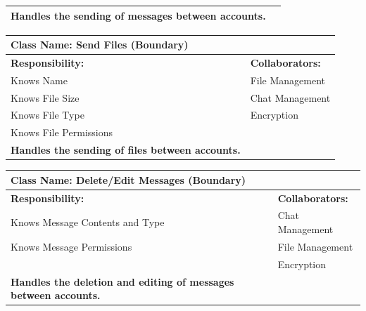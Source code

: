 \documentclass[]{article}
\begin{document}
\begin{itemize}
\begin{table}[ht]
\begin{tabular}{|p{7cm}|p{7cm}|}
            \vspace{0.1in}
            \textbf{Handles the sending of messages between accounts.}

		\vspace{1in} & \\
		\hline
  
		\end{tabular}
	\end{table}

 
	\begin{table}[ht]
		\centering
		\begin{tabular}{|p{7cm}|p{7cm}|}
		\hline 
		 \multicolumn{2}{|l|}{\textbf{Class Name: Send Files (Boundary)
}} \\
		\hline
		\textbf{Responsibility:} & \textbf{Collaborators:} \\
		\hline
            Knows Name & File Management\\
            Knows File Size & Chat Management\\
            Knows File Type & Encryption\\
            Knows File Permissions\\
            
            \vspace{0.1in}
            \textbf{Handles the sending of files between accounts.}

		\vspace{1in} & \\
		\hline
  
		\end{tabular}
	\end{table}

	\begin{table}[ht]
		\centering
		\begin{tabular}{|p{7cm}|p{7cm}|}
		\hline 
		 \multicolumn{2}{|l|}{\textbf{Class Name: Delete/Edit Messages (Boundary)
}} \\
		\hline
		\textbf{Responsibility:} & \textbf{Collaborators:} \\
		\hline
            Knows Message Contents and Type & Chat Management\\
            Knows Message Permissions & File Management\\
            & Encryption\\
            
            \vspace{0.1in}
            \textbf{Handles the deletion and editing of messages between accounts.}


\end{tabular}
\end{table}
\end{itemize}
\end{document}
